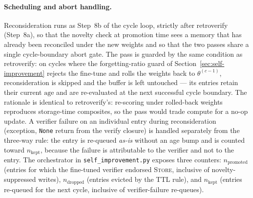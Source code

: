 \paragraph{Scheduling and abort handling.}
Reconsideration runs as Step~8b of the cycle loop, strictly after retroverify (Step~8a), so that the novelty check at promotion time sees a memory that has already been reconciled under the new weights and so that the two passes share a single cycle-boundary abort gate. The pass is guarded by the same condition as retroverify: on cycles where the forgetting-ratio guard of Section~\ref{sec:self-improvement} rejects the fine-tune and rolls the weights back to $\theta^{(c-1)}$, reconsideration is skipped and the buffer is left untouched --- its entries retain their current $\mathrm{age}$ and are re-evaluated at the next successful cycle boundary. The rationale is identical to retroverify's: re-scoring under rolled-back weights reproduces storage-time composites, so the pass would trade compute for a no-op update. A verifier failure on an individual entry during reconsideration (exception, \texttt{None} return from the verify closure) is handled separately from the three-way rule: the entry is re-queued \emph{as-is} without an age bump and is counted toward $n_{\text{kept}}$, because the failure is attributable to the verifier and not to the entry. The orchestrator in \texttt{self\_improvement.py} exposes three counters: $n_{\text{promoted}}$ (entries for which the fine-tuned verifier endorsed \textsc{Store}, inclusive of novelty-suppressed writes), $n_{\text{dropped}}$ (entries evicted by the TTL rule), and $n_{\text{kept}}$ (entries re-queued for the next cycle, inclusive of verifier-failure re-queues).

